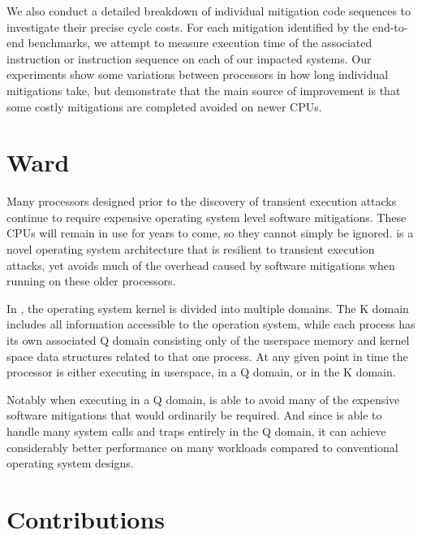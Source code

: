 We also conduct a detailed breakdown of individual mitigation code sequences to investigate their precise cycle costs.
For each mitigation identified by the end-to-end benchmarks, we attempt to measure execution time of the associated instruction or instruction sequence on each of our impacted systems.
Our experiments show some variations between processors in how long individual mitigations take, but demonstrate that the main source of improvement is that some costly mitigations are completed avoided on newer CPUs. 

\section{Ward}
Many processors designed prior to the discovery of transient execution attacks continue to require expensive operating system level software mitigations.
These CPUs will remain in use for years to come, so they cannot simply be ignored.
\sys is a novel operating system architecture that is resilient to transient execution attacks, yet avoids much of the overhead caused by software mitigations when running on these older processors.

In \sys, the operating system kernel is divided into multiple domains.
The K domain includes all information accessible to the operation system, while each process has its own associated Q domain consisting only of the userspace memory and kernel space data structures related to that one process.
At any given point in time the processor is either executing in userspace, in a Q domain, or in the K domain. 

Notably when executing in a Q domain, \sys is able to avoid many of the expensive software mitigations that would ordinarily be required.
And since \sys is able to handle many system calls and traps entirely in the Q domain, it can achieve considerably better performance on many workloads compared to conventional operating system designs.

\section{Contributions}


